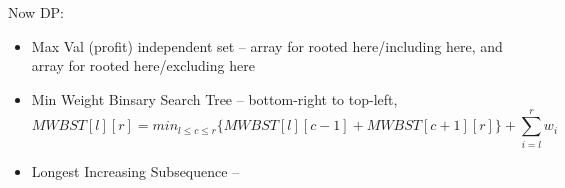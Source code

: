 \documentclass[12pt]{article}
\begin{document}
\pagebreak

Now DP:
\begin{itemize}
  \item Max Val (profit) independent set -- array for rooted here/including here, and array for rooted here/excluding here
  \item Min Weight Binsary Search Tree -- bottom-right to top-left, $$MWBST[l][r] = min_{l\leq c\leq r}\{MWBST[l][c-1] + MWBST[c+1][r]\} + \sum_{i=l}^r w_i$$
  \item Longest Increasing Subsequence -- 
\end{itemize}
\end{document}
